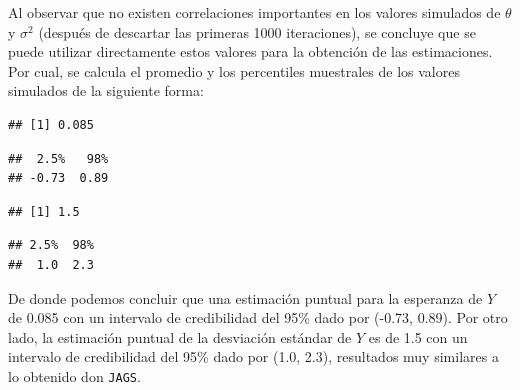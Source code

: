 \begin{Eje}
\begin{knitrout}
\end{knitrout}
Al observar que no existen correlaciones importantes en los valores simulados de $\theta$ y $\sigma^2$ (después de descartar las primeras 1000 iteraciones), se concluye que se puede utilizar directamente estos valores para la obtención de las estimaciones. Por cual, se calcula el promedio y los percentiles muestrales de los valores simulados de la siguiente forma:
\begin{knitrout}
\color{fgcolor}\begin{kframe}
\begin{alltt}
\hlstd{(theta.pos[}\hlopt{:}\hlstd{nsim])}
\end{alltt}
\begin{verbatim}
## [1] 0.085
\end{verbatim}
\begin{alltt}
\hlstd{(theta.pos[}\hlopt{:}\hlstd{nsim],} \hlstd{(}\hlstd{,}\hlstd{))}
\end{alltt}
\begin{verbatim}
##  2.5%   98% 
## -0.73  0.89
\end{verbatim}
\begin{alltt}
\hlstd{(}\hlstd{(sigma2.pos[}\hlopt{:}\hlstd{nsim]))}
\end{alltt}
\begin{verbatim}
## [1] 1.5
\end{verbatim}
\begin{alltt}
\hlstd{(}\hlstd{(sigma2.pos[}\hlopt{:}\hlstd{nsim]),} \hlstd{(}\hlstd{,}\hlstd{))}
\end{alltt}
\begin{verbatim}
## 2.5%  98% 
##  1.0  2.3
\end{verbatim}
\end{kframe}
\end{knitrout}

De donde podemos concluir que una estimación puntual para la esperanza de $Y$ de 0.085 con un intervalo de credibilidad del 95\% dado por (-0.73, 0.89). Por otro lado, la estimación puntual de la desviación estándar de $Y$ es de 1.5 con un intervalo de credibilidad del 95\% dado por (1.0, 2.3), resultados muy similares a lo obtenido don \verb'JAGS'. 


\end{Eje}
